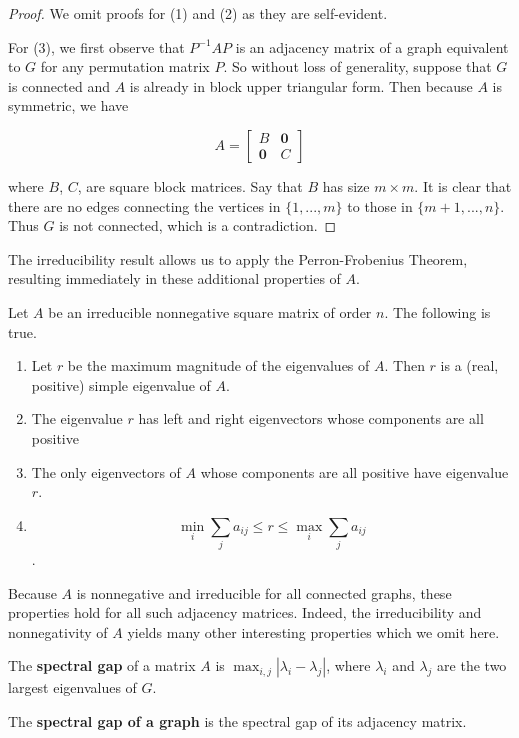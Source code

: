 \begin{proof}
  We omit proofs for (1) and (2) as they are self-evident.

  For (3), we first observe that $P^{-1}AP$ is an adjacency matrix of a graph
  equivalent to $G$ for any permutation matrix $P$. So without loss of generality, suppose that $G$ is
  connected and $A$ is already in block upper triangular form. Then because $A$
  is symmetric, we have

  \[
    A = \begin{bmatrix}
      B & \mathbf{0} \\
      \mathbf{0} & C
    \end{bmatrix}
  \]

  where $B$, $C$, are square block matrices. Say that $B$ has size $m \times m$. It is clear that
  there are no edges connecting the vertices in $\{1, ..., m\}$ to those in $\{m+1, ..., n\}$. Thus
  $G$ is not connected, which is a contradiction.
\end{proof}

The irreducibility result allows us to apply the Perron-Frobenius Theorem, resulting immediately in
these additional properties of $A$.

\begin{theorem}
  Let $A$ be an irreducible nonnegative square matrix of order $n$. The
  following is true.

  \begin{enumerate}
  \item Let $r$ be the maximum magnitude of the eigenvalues of $A$. Then $r$ is
    a (real, positive) simple eigenvalue of $A$.
  \item The eigenvalue $r$ has left and right eigenvectors whose components are
    all positive
  \item The only eigenvectors of $A$ whose components are all positive have
    eigenvalue $r$.
  \item
    \[ \min_i \sum_j a_{ij} \leq r \leq \max_i \sum_j a_{ij} \].
  \end{enumerate}
\end{theorem}

Because $A$ is nonnegative and irreducible for all connected graphs, these
properties hold for all such adjacency matrices. Indeed, the irreducibility and
nonnegativity of $A$ yields many other interesting properties which we omit
here.

\begin{definition}
  The \textbf{spectral gap} of a matrix $A$ is $\max_{i,j}|\lambda_i - \lambda_j|$, where
  $\lambda_i$ and $\lambda_j$ are the two largest eigenvalues of $G$.

  The \textbf{spectral gap of a graph} is the spectral gap of its adjacency matrix.
\end{definition}

